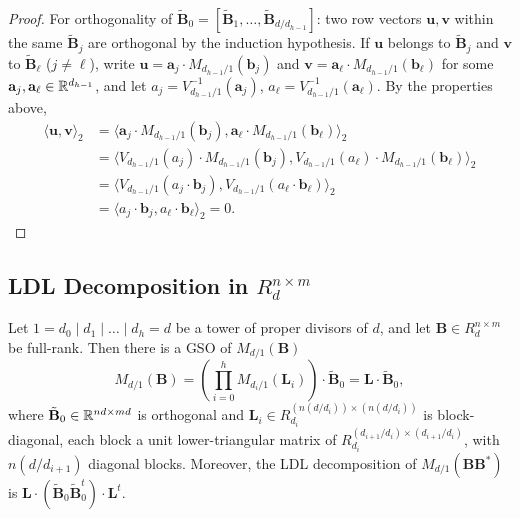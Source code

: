 \begin{proof}
	For orthogonality of $\tilde{\mathbf{B}}_0 = [\tilde{\mathbf{B}}_1, \dots, \tilde{\mathbf{B}}_{d/d_{h-1}}]$: two row vectors $\mathbf{u}, \mathbf{v}$ within the same $\tilde{\mathbf{B}}_j$ are orthogonal by the induction hypothesis. If $\mathbf{u}$ belongs to $\tilde{\mathbf{B}}_j$ and $\mathbf{v}$ to $\tilde{\mathbf{B}}_\ell$ ($j \ne \ell$), write $\mathbf{u} = \mathbf{a}_j \cdot M_{d_{h-1}/1}(\mathbf{b}_j)$ and $\mathbf{v} = \mathbf{a}_\ell \cdot M_{d_{h-1}/1}(\mathbf{b}_\ell)$ for some $\mathbf{a}_j, \mathbf{a}_\ell \in \mathbb{R}^{d_{h-1}}$, and let $a_j = V_{d_{h-1}/1}^{-1}(\mathbf{a}_j)$, $a_\ell = V_{d_{h-1}/1}^{-1}(\mathbf{a}_\ell)$. By the properties above,
	\begin{align*}
		\langle \mathbf{u}, \mathbf{v} \rangle_2
		&= \langle \mathbf{a}_j \cdot M_{d_{h-1}/1}(\mathbf{b}_j), \mathbf{a}_\ell \cdot M_{d_{h-1}/1}(\mathbf{b}_\ell) \rangle_2 \\
		&= \langle V_{d_{h-1}/1}(a_j) \cdot M_{d_{h-1}/1}(\mathbf{b}_j), V_{d_{h-1}/1}(a_\ell) \cdot M_{d_{h-1}/1}(\mathbf{b}_\ell) \rangle_2 \\
		&= \langle V_{d_{h-1}/1}(a_j \cdot \mathbf{b}_j), V_{d_{h-1}/1}(a_\ell \cdot \mathbf{b}_\ell) \rangle_2 \\
		&= \langle a_j \cdot \mathbf{b}_j, a_\ell \cdot \mathbf{b}_\ell \rangle_2 = 0.
	\end{align*}
\end{proof}

\subsection{LDL Decomposition in \texorpdfstring{$R_d^{n \times m}$}{Rd\^{}(n x m)}}

\begin{theorem}
	\label{thm:ldl-rdnm}
	Let $1 = d_0 \mid d_1 \mid \dots \mid d_h = d$ be a tower of proper divisors of $d$, and let $\mathbf{B} \in R_d^{n \times m}$ be full-rank. Then there is a GSO of $M_{d/1}(\mathbf{B})$
	\[
		M_{d/1}(\mathbf{B}) = \left( \prod_{i=0}^{h} M_{d_i/1}(\mathbf{L}_i) \right) \cdot \tilde{\mathbf{B}}_0 = \mathbf{L} \cdot \tilde{\mathbf{B}}_0,
	\]
	where $\tilde{\mathbf{B}}_0 \in \mathbb{R}^{nd \times md}$ is orthogonal and $\mathbf{L}_i \in R_{d_i}^{(n(d/d_i)) \times (n(d/d_i))}$ is block-diagonal, each block a unit lower-triangular matrix of $R_{d_i}^{(d_{i+1}/d_i) \times (d_{i+1}/d_i)}$, with $n(d/d_{i+1})$ diagonal blocks. Moreover, the LDL decomposition of $M_{d/1}(\mathbf{BB}^*)$ is $\mathbf{L} \cdot (\tilde{\mathbf{B}}_0 \tilde{\mathbf{B}}_0^t) \cdot \mathbf{L}^t$.
\end{theorem}

